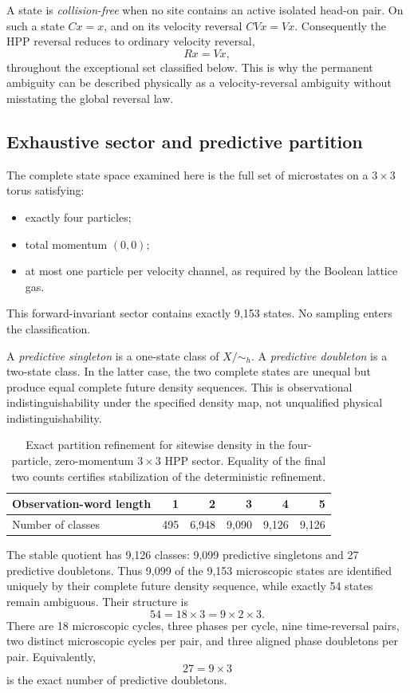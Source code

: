 \documentclass[11pt]{article}
\begin{document}
A state is \emph{collision-free} when no site contains an active isolated
head-on pair. On such a state $Cx=x$, and on its velocity reversal $CVx=Vx$.
Consequently the HPP reversal reduces to ordinary velocity reversal,
\[
Rx=Vx,
\]
throughout the exceptional set classified below. This is why the permanent
ambiguity can be described physically as a velocity-reversal ambiguity without
misstating the global reversal law.

\subsection{Exhaustive sector and predictive partition}

The complete state space examined here is the full set of microstates on a
$3\times3$ torus satisfying:
\begin{itemize}[leftmargin=1.5em]
  \item exactly four particles;
  \item total momentum $(0,0)$;
  \item at most one particle per velocity channel, as required by the Boolean
  lattice gas.
\end{itemize}
This forward-invariant sector contains exactly 9,153 states. No sampling enters
the classification.

A \emph{predictive singleton} is a one-state class of $X/{\sim_h}$. A
\emph{predictive doubleton} is a two-state class. In the latter case, the two
complete states are unequal but produce equal complete future density sequences.
This is observational indistinguishability under the specified density map, not
unqualified physical indistinguishability.

\begin{table}[ht]
\centering
\begin{tabular}{lrrrrr}
\toprule
Observation-word length & 1 & 2 & 3 & 4 & 5 \\
\midrule
Number of classes & 495 & 6,948 & 9,090 & 9,126 & 9,126 \\
\bottomrule
\end{tabular}
\caption{Exact partition refinement for sitewise density in the four-particle,
zero-momentum $3\times3$ HPP sector. Equality of the final two counts certifies
stabilization of the deterministic refinement.}
\label{tab:hpprefinement}
\end{table}

The stable quotient has 9,126 classes: 9,099 predictive singletons and 27
predictive doubletons. Thus 9,099 of the 9,153 microscopic states are identified
uniquely by their complete future density sequence, while exactly 54 states remain
ambiguous. Their structure is
\[
54=18\times3=9\times2\times3.
\]
There are 18 microscopic cycles, three phases per cycle, nine time-reversal pairs,
two distinct microscopic cycles per pair, and three aligned phase doubletons per
pair. Equivalently,
\[
27=9\times3
\]
is the exact number of predictive doubletons.
\end{document}
